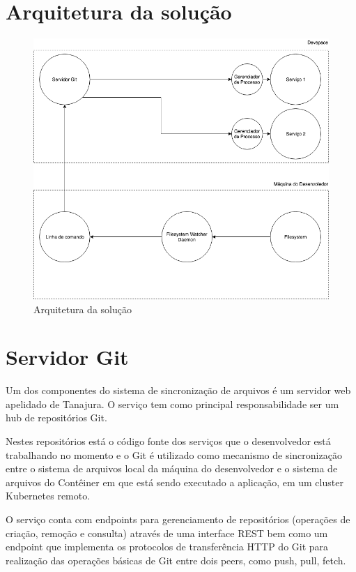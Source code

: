 \documentclass[]{politex}
\begin{document}
	\section{Arquitetura da solução}
		\begin{figure}[htb]
			\caption{\label{fig_arquitetura1}Arquitetura da solução}
			\begin{center}
			\includegraphics[scale=0.50]{arquitetura-da-solucao.png}
			\end{center}
		\end{figure}
	\section{Servidor Git}
	Um dos componentes do sistema de sincronização de arquivos é um servidor web apelidado de Tanajura. O serviço tem como principal responsabilidade ser um hub de repositórios Git.
	
	Nestes repositórios está o código fonte dos serviços que o desenvolvedor está trabalhando no momento e o Git é utilizado como mecanismo de sincronização entre o sistema de arquivos local da máquina do desenvolvedor e o sistema de arquivos do Contêiner em que está sendo executado a aplicação, em um cluster Kubernetes remoto.
	
	O serviço conta com endpoints para gerenciamento de repositórios (operações de criação, remoção e consulta) através de uma interface REST bem como um endpoint que implementa os protocolos de transferência HTTP do Git para realização das operações básicas de Git entre dois peers, como push, pull, fetch.
	
\end{document}
